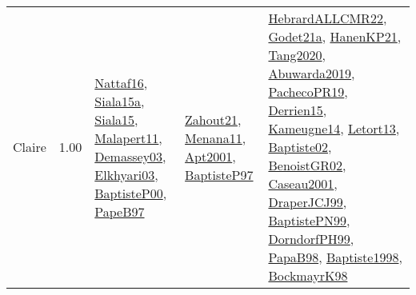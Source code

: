 {\begin{longtable}{p{3cm}r>{\raggedright\arraybackslash}p{6cm}>{\raggedright\arraybackslash}p{6cm}>{\raggedright\arraybackslash}p{8cm}}
\index{Claire}\index{CPSystems!Claire}Claire &  1.00 & \hyperref[detail:Nattaf16]{Nattaf16}, \hyperref[detail:Siala15a]{Siala15a}, \hyperref[detail:Siala15]{Siala15}, \hyperref[detail:Malapert11]{Malapert11}, \hyperref[detail:Demassey03]{Demassey03}, \hyperref[detail:Elkhyari03]{Elkhyari03}, \hyperref[detail:BaptisteP00]{BaptisteP00}, \hyperref[detail:PapeB97]{PapeB97} & \hyperref[detail:Zahout21]{Zahout21}, \hyperref[detail:Menana11]{Menana11}, \hyperref[detail:Apt2001]{Apt2001}, \hyperref[detail:BaptisteP97]{BaptisteP97} & \hyperref[detail:HebrardALLCMR22]{HebrardALLCMR22}, \hyperref[detail:Godet21a]{Godet21a}, \hyperref[detail:HanenKP21]{HanenKP21}, \hyperref[detail:Tang2020]{Tang2020}, \hyperref[detail:Abuwarda2019]{Abuwarda2019}, \hyperref[detail:PachecoPR19]{PachecoPR19}, \hyperref[detail:Derrien15]{Derrien15}, \hyperref[detail:Kameugne14]{Kameugne14}, \hyperref[detail:Letort13]{Letort13}, \hyperref[detail:Baptiste02]{Baptiste02}, \hyperref[detail:BenoistGR02]{BenoistGR02}, \hyperref[detail:Caseau2001]{Caseau2001}, \hyperref[detail:DraperJCJ99]{DraperJCJ99}, \hyperref[detail:BaptistePN99]{BaptistePN99}, \hyperref[detail:DorndorfPH99]{DorndorfPH99}, \hyperref[detail:PapaB98]{PapaB98}, \hyperref[detail:Baptiste1998]{Baptiste1998}, \hyperref[detail:BockmayrK98]{BockmayrK98}\\

\end{longtable}}

